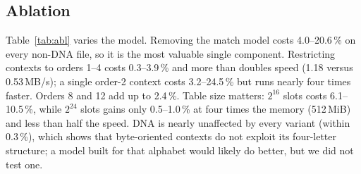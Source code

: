 \documentclass[conference]{IEEEtran}
\newcommand{\cm}{\textsf{augur-cm}}
\begin{document}
\begin{table}[t]
\caption{Highest bandwidth at which \cm{} is still the fastest option (static case), and the factor by which its decoding must speed up to be fastest at 2, 10 and 50\,Mbit/s (Eq.~\ref{eq:need}).}
\label{tab:cross}
\centering\scriptsize

\end{table}

\begin{table}[!t]
\caption{Ablation of \cm{}. $\Delta$ is the change in compressed size relative to the full model, as the mean and range over the five non-DNA files (source code, prose, log, JSON, executable); DNA is the bacterial genome. MB/s is the median compress throughput over the five files. Per-file values are in the repository.}
\label{tab:abl}
\centering\scriptsize

\end{table}

\subsection{Ablation}
Table~\ref{tab:abl} varies the model. Removing the match model costs 4.0--20.6\,\% on every non-DNA file, so it is the most valuable single component. Restricting contexts to orders 1--4 costs 0.3--3.9\,\% and more than doubles speed (1.18 versus 0.53\,MB/s); a single order-2 context costs 3.2--24.5\,\% but runs nearly four times faster. Orders 8 and 12 add up to 2.4\,\%. Table size matters: $2^{16}$ slots costs 6.1--10.5\,\%, while $2^{24}$ slots gains only 0.5--1.0\,\% at four times the memory (512\,MiB) and less than half the speed. DNA is nearly unaffected by every variant (within 0.3\,\%), which shows that byte-oriented contexts do not exploit its four-letter structure; a model built for that alphabet would likely do better, but we did not test one.

\begin{table}[!t]
\caption{Simulated speedup over LRU without prefetching (SATA SSD model, 3 seeds, median).}
\label{tab:storage}
\centering\scriptsize
\setlength{\tabcolsep}{2.5pt}

\end{table}
\end{document}
